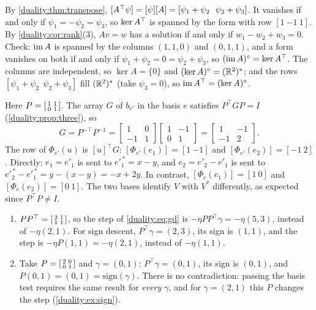 By \cref{duality:thm:transpose}, $[A^{\top}\psi] = [\psi][A]
= [\psi_1 + \psi_2\ \ \psi_2 + \psi_3]$. It vanishes if and only if
$\psi_1 = -\psi_2 = \psi_3$, so $\ker A^{\top}$ is spanned by the form with
row $[1\ {-1}\ 1]$. By \cref{duality:cor:rank}(3), $Av = w$ has a solution
if and only if $w_1 - w_2 + w_3 = 0$. Check: $\operatorname{im} A$ is spanned by the
columns $(1, 1, 0)$ and $(0, 1, 1)$, and a form vanishes on both if and
only if $\psi_1 + \psi_2 = 0 = \psi_2 + \psi_3$, so
$(\operatorname{im} A)^\circ = \ker A^{\top}$. The columns are independent, so
$\ker A = \{0\}$ and $(\ker A)^\circ = (\mathbb{R}^2)^*$; and the rows
$[\psi_1 + \psi_2\ \ \psi_2 + \psi_3]$ fill $(\mathbb{R}^2)^*$ (take $\psi_3 = 0$),
so $\operatorname{im}A^{\top} = (\ker A)^\circ$.

Here $P = \begin{bsmallmatrix}1 & 1\\0 & 1\end{bsmallmatrix}$. The array
$G$ of $b_{e'}$ in the basis $e$ satisfies $P^\top GP = I$
(\cref{duality:prop:three}), so
\[
  G = P^{-\top}P^{-1}
  = \begin{bmatrix}1 & 0\\-1 & 1\end{bmatrix}
    \begin{bmatrix}1 & -1\\0 & 1\end{bmatrix}
  = \begin{bmatrix}1 & -1\\-1 & 2\end{bmatrix} .
\]
The row of $\Phi_{e'}(u)$ is $[u]^\top G$: $[\Phi_{e'}(e_1)] = [1\ {-1}]$
and $[\Phi_{e'}(e_2)] = [{-1}\ 2]$. Directly: $e_1 = e'_1$ is sent to
$e'^{\,*}_1 = x - y$, and $e_2 = e'_2 - e'_1$ is sent to
$e'^{\,*}_2 - e'^{\,*}_1 = y - (x - y) = -x + 2y$. In contrast,
$[\Phi_e(e_1)] = [1\ 0]$ and $[\Phi_e(e_2)] = [0\ 1]$. The two bases
identify $V$ with $V^*$ differently, as expected since $P^\top P\neq I$.

\begin{enumerate}[nosep]
  \item $PP^\top = \begin{bsmallmatrix}2 & 1\\1 & 1\end{bsmallmatrix}$,
        so the step of \eqref{duality:eq:gd} is
        $-\eta PP^\top\gamma = -\eta(5, 3)$, instead of $-\eta(2, 1)$.
        For sign descent, $P^\top\gamma = (2, 3)$, its sign is $(1, 1)$,
        and the step is $-\eta P(1, 1) = -\eta(2, 1)$, instead of
        $-\eta(1, 1)$.
  \item Take $P = \begin{bsmallmatrix}2 & 0\\0 & 1\end{bsmallmatrix}$ and
        $\gamma = (0, 1)$: $P^\top\gamma = (0, 1)$, its sign is $(0, 1)$,
        and $P(0, 1) = (0, 1) = \mathrm{sign}(\gamma)$. There is no
        contradiction: passing the basis test requires the same result
        for \emph{every} $\gamma$, and for $\gamma = (2, 1)$ this $P$
        changes the step (\cref{duality:ex:sign}).
\end{enumerate}

